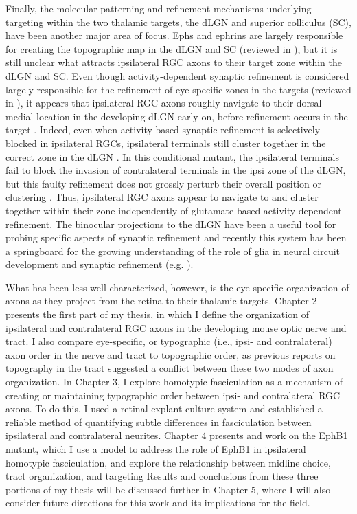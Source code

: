 Finally, the molecular patterning and refinement mechanisms underlying targeting within the two thalamic targets, the dLGN and superior colliculus (SC), have been another major area of focus.
Ephs and ephrins are largely responsible for creating the topographic map in the dLGN and SC (reviewed in ), but it is still unclear what attracts ipsilateral RGC axons to their target zone within the dLGN and SC.
Even though activity-dependent synaptic refinement is considered largely responsible for the refinement of eye-specific zones in the targets (reviewed in ), it appears that ipsilateral RGC axons roughly navigate to their dorsal-medial location in the developing dLGN early on, before refinement occurs in the target \cite{jaubert2005structural}.
Indeed, even when activity-based synaptic refinement is selectively blocked in ipsilateral RGCs, ipsilateral terminals still cluster together in the correct zone in the dLGN \cite{koch2011pathway}.
In this conditional mutant, the ipsilateral terminals fail to block the invasion of contralateral terminals in the ipsi zone of the dLGN, but this faulty refinement does not grossly perturb their overall position or clustering \cite{koch2011pathway}.
Thus, ipsilateral RGC axons appear to navigate to and cluster together within their zone independently of glutamate based activity-dependent refinement.
The binocular projections to the dLGN have been a useful tool for probing specific aspects of synaptic refinement and recently this system has been a springboard for the growing understanding of the role of glia in neural circuit development and synaptic refinement (e.g. ).

What has been less well characterized, however, is the eye-specific organization of axons as they project from the retina to their thalamic targets.
Chapter 2 presents the first part of my thesis, in which I define the organization of ipsilateral and contralateral RGC axons in the developing mouse optic nerve and tract.
I also compare eye-specific, or typographic (i.e., ipsi- and contralateral) axon order in the nerve and tract to topographic order, as previous reports on topography in the tract suggested a conflict between these two modes of axon organization.
In Chapter 3, I explore homotypic fasciculation as a mechanism of creating or maintaining typographic order between ipsi- and contralateral RGC axons.
To do this, I used a retinal explant culture system and established a reliable method of quantifying subtle differences in fasciculation between ipsilateral and contralateral neurites.
Chapter 4 presents \invivo{} and \invitro{} work on the EphB1 mutant, which I use a model to address the role of EphB1 in ipsilateral homotypic fasciculation, and explore the relationship between midline choice, tract organization, and targeting
Results and conclusions from these three portions of my thesis will be discussed further in Chapter 5, where I will also consider future directions for this work and its implications for the field.

